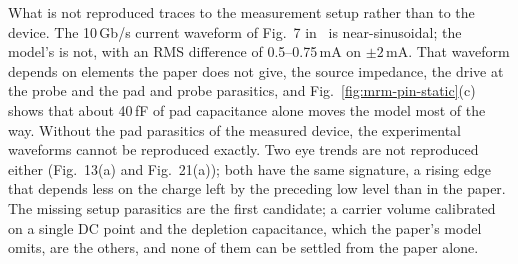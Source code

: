 What is not reproduced traces to the measurement setup rather than to the device. The 10\,Gb/s
current waveform of Fig.~7 in~\cite{wang2016mrm} is near-sinusoidal; the model's is not, with
an RMS difference of 0.5--0.75\,mA on $\pm2$\,mA. That waveform depends on elements the paper
does not give, the source impedance, the drive at the probe and the pad and probe parasitics,
and Fig.~\ref{fig:mrm-pin-static}(c) shows that about 40\,fF of pad capacitance alone moves
the model most of the way. Without the pad parasitics of the measured device, the experimental
waveforms cannot be reproduced exactly. Two eye trends are not reproduced either (Fig.~13(a)
and Fig.~21(a)); both have the same signature, a rising edge that depends less on the charge
left by the preceding low level than in the paper. The missing setup parasitics are the first
candidate; a carrier volume calibrated on a single DC point and the depletion capacitance, which
the paper's model omits, are the others, and none of them can be settled from the paper alone.

